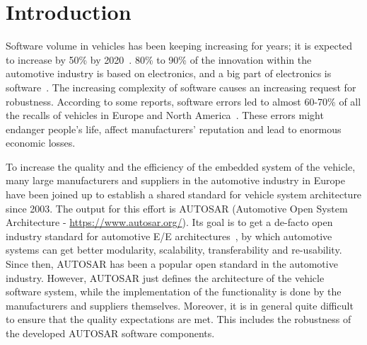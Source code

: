 \section{Introduction}\label{sec:introduction}

Software volume in vehicles has been keeping increasing for years; it is expected to increase by 50\% by 2020~\cite{ll}. 80\%
to 90\% of the innovation within the automotive industry is
based on electronics, and a big part of electronics is software~\cite{Knauss2016}.
The increasing complexity of software causes an increasing request for robustness. According to some reports, software errors led to almost 60-70\% of all the recalls of vehicles in Europe and North America~\cite{ll}. These errors might endanger people's life, affect manufacturers' reputation and lead to enormous economic losses. 

To increase the quality and the efficiency %
of the embedded system of the vehicle, many large manufacturers and suppliers in the automotive industry in Europe have been joined up to establish a shared standard for vehicle system architecture since 2003. The output for this effort is AUTOSAR (Automotive Open System Architecture - {\small \url{https://www.autosar.org/}}). %
Its goal is to get a de-facto open industry standard for automotive E/E architectures~\cite{aa}, by which automotive systems can get better modularity, scalability, transferability and re-usability. Since then, AUTOSAR has been a popular open standard in the automotive industry. 
%
%
However, %
AUTOSAR just defines the architecture of the vehicle software system, while the implementation of the functionality is done by the manufacturers and suppliers themselves. Moreover, it is in general quite difficult to ensure that the quality expectations are met. %
This includes the %
robustness of the developed AUTOSAR software components. %

